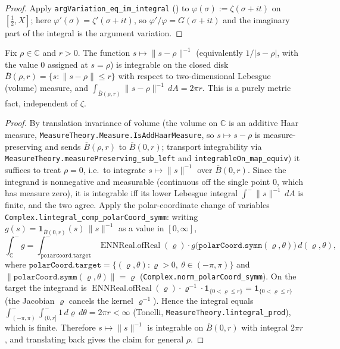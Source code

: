 \begin{proof}
\leanok
{}
Apply \texttt{argVariation\_eq\_im\_integral} () to
$\varphi(\sigma):=\zeta(\sigma+it)$ on $[\tfrac12,X]$; here
$\varphi'(\sigma)=\zeta'(\sigma+it)$, so $\varphi'/\varphi=G(\sigma+it)$ and the
imaginary part of the integral is the argument variation.
\end{proof}

\begin{lemma}
\label{lem:lb_newton_kernel}
\leanok
Fix $\rho\in\mathbb{C}$ and $r>0$. The function $s\mapsto\lVert s-\rho\rVert^{-1}$
(equivalently $1/|s-\rho|$, with the value $0$ assigned at $s=\rho$) is integrable
on the closed disk $\overline{B}(\rho,r)=\{s:\lVert s-\rho\rVert\le r\}$ with
respect to two-dimensional Lebesgue (volume) measure, and
$\int_{\overline{B}(\rho,r)}\lVert s-\rho\rVert^{-1}\,dA = 2\pi r$.
This is a purely metric fact, independent of $\zeta$.
\end{lemma}

\begin{proof}
\leanok
By translation invariance of volume (the volume on $\mathbb{C}$ is an additive
Haar measure, \texttt{MeasureTheory.Measure.IsAddHaarMeasure}, so $s\mapsto s-\rho$
is measure-preserving and sends $\overline{B}(\rho,r)$ to $\overline{B}(0,r)$;
transport integrability via \texttt{MeasureTheory.measurePreserving\_sub\_left}
and \texttt{integrableOn\_map\_equiv}) it
suffices to treat $\rho=0$, i.e.\ to integrate $s\mapsto\lVert s\rVert^{-1}$ over
$\overline{B}(0,r)$. Since the integrand is nonnegative and measurable
(continuous off the single point $0$, which has measure zero), it is integrable
iff its lower Lebesgue integral $\int^-\lVert s\rVert^{-1}\,dA$ is finite, and the
two agree. Apply the polar-coordinate change of variables
\texttt{Complex.lintegral\_comp\_polarCoord\_symm}: writing
$g(s)=\mathbf 1_{\overline{B}(0,r)}(s)\,\lVert s\rVert^{-1}$ as a value in
$[0,\infty]$,
\[
  \int^-_{\mathbb{C}} g
  = \int^-_{\texttt{polarCoord.target}}
      \operatorname{ENNReal.ofReal}(\varrho)\cdot
      g\bigl(\texttt{polarCoord.symm}(\varrho,\theta)\bigr)\,d(\varrho,\theta),
\]
where $\texttt{polarCoord.target}=\{(\varrho,\theta):\varrho>0,\ \theta\in(-\pi,\pi)\}$
and $\lVert\texttt{polarCoord.symm}(\varrho,\theta)\rVert=\varrho$
(\texttt{Complex.norm\_polarCoord\_symm}). On the target the integrand is
$\operatorname{ENNReal.ofReal}(\varrho)\cdot\varrho^{-1}\cdot
\mathbf 1_{\{0<\varrho\le r\}}=\mathbf 1_{\{0<\varrho\le r\}}$ (the Jacobian
$\varrho$ cancels the kernel $\varrho^{-1}$). Hence the integral equals
$\int^-_{(-\pi,\pi)}\!\int^-_{(0,r]}1\,d\varrho\,d\theta=2\pi r<\infty$
(Tonelli, \texttt{MeasureTheory.lintegral\_prod}), which is finite. Therefore
$s\mapsto\lVert s\rVert^{-1}$ is integrable on $\overline{B}(0,r)$ with integral
$2\pi r$, and translating back gives the claim for general $\rho$.
\end{proof}

